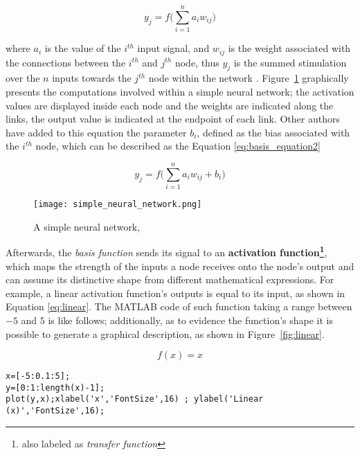 \documentclass{WileySev}
\begin{document}
\begin{equation}
y_{j}=f\Big(\sum_{i=1}^n a_i w_{ij} \Big) \label{eq:1} %
\end{equation}

where $a_i$ is the value of the $i^{th}$ input signal, and $w_{ij}$ is the weight associated with the connections between the $i^{th}$ and $j^{th}$ node, thus $y_j$ is the summed stimulation over the $n$ inputs towards the $j^{th}$ node within the network \cite[chap. 7]{friedenberg2011cognitive}. Figure~\ref{fig:neural network} graphically presents the computations involved within a simple neural network; the activation values are displayed inside each node and the weights are indicated along the links, the output value is indicated at the endpoint of each link. Other authors \cite{jiang2010medical,tsoukalas1996fuzzy} have added to this equation the parameter $b_i$, defined as the bias associated with the $i^{th}$ node, which can be described as the Equation \ref{eq:basis_equation2}

\begin{equation}
y_j=f\Big( \sum_{i=1}^n a_i w_{ij} +b_i\Big) \label{eq:basis_equation2} %
\end{equation}

\begin{figure}
  \texttt{[image: simple\_neural\_network.png]}
  \centering
  \caption{A simple neural network, \cite{friedenberg2011cognitive}}
  \label{fig:neural network}
\end{figure}

Afterwards, the \textit{basis function} sends its signal to an \textbf{activation function\footnote{also labeled as \textit{transfer function}}}, which maps the strength of the inputs a node receives onto the node's output and can assume its distinctive shape from different mathematical expressions. For example, a linear activation function's outputs is equal to its input, as shown in Equation \ref{eq:linear}. The MATLAB code of such function taking a range between $-5$ and $5$ is like follows; additionally, as to evidence the function's shape it is possible to generate a graphical description, as shown in Figure~\ref{fig:linear}.

\begin{equation}
f(x)=x \label{eq:linear}
\end{equation}

\begin{lstlisting}
x=[-5:0.1:5];
y=[0:1:length(x)-1];
plot(y,x);xlabel('x','FontSize',16) ; ylabel('Linear (x)','FontSize',16);
\end{lstlisting}
\end{document}
